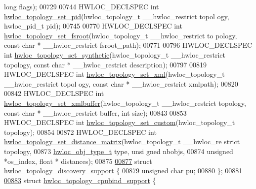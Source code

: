 \begin{DoxyCode}
      \textcolor{keywordtype}{long} flags);
00729 
00744 HWLOC\_DECLSPEC \textcolor{keywordtype}{int} \hyperlink{a00044_gae1100de0162b3c6a9db750ac14629c05}{hwloc_topology_set_pid}(hwloc\_topology\_t \_\_hwloc\_restrict topol
      ogy, hwloc\_pid\_t pid);
00745 
00770 HWLOC\_DECLSPEC \textcolor{keywordtype}{int} \hyperlink{a00044_ga2f6bfb6958d8b508ea1d7d5bb266432c}{hwloc_topology_set_fsroot}(hwloc\_topology\_t \_\_hwloc\_restrict to
      pology, \textcolor{keyword}{const} \textcolor{keywordtype}{char} * \_\_hwloc\_restrict fsroot\_path);
00771 
00796 HWLOC\_DECLSPEC \textcolor{keywordtype}{int} \hyperlink{a00044_ga2fcb52181b586c20f001b7a999550324}{hwloc_topology_set_synthetic}(hwloc\_topology\_t \_\_hwloc\_restrict
       topology, \textcolor{keyword}{const} \textcolor{keywordtype}{char} * \_\_hwloc\_restrict description);
00797 
00819 HWLOC\_DECLSPEC \textcolor{keywordtype}{int} \hyperlink{a00044_ga93efcc8a962afe1ed23393700682173f}{hwloc_topology_set_xml}(hwloc\_topology\_t \_\_hwloc\_restrict topol
      ogy, \textcolor{keyword}{const} \textcolor{keywordtype}{char} * \_\_hwloc\_restrict xmlpath);
00820 
00842 HWLOC\_DECLSPEC \textcolor{keywordtype}{int} \hyperlink{a00044_gae7e4bade144652a2b48f5eaf0309b4ec}{hwloc_topology_set_xmlbuffer}(hwloc\_topology\_t \_\_hwloc\_restrict
       topology, \textcolor{keyword}{const} \textcolor{keywordtype}{char} * \_\_hwloc\_restrict buffer, \textcolor{keywordtype}{int} size);
00843 
00853 HWLOC\_DECLSPEC \textcolor{keywordtype}{int} \hyperlink{a00044_ga12024fec46f9368fb8fc5c624089c5ec}{hwloc_topology_set_custom}(hwloc\_topology\_t topology);
00854 
00872 HWLOC\_DECLSPEC \textcolor{keywordtype}{int} \hyperlink{a00044_gabda6afa67a495cd652f064ad51d3fe47}{hwloc_topology_set_distance_matrix}(hwloc\_topology\_t \_\_hwloc\_re
      strict topology,
00873                                                       \hyperlink{a00041_gacd37bb612667dc437d66bfb175a8dc55}{hwloc_obj_type_t} type, \textcolor{keywordtype}{unsi
      gned} nbobjs,
00874                                                       \textcolor{keywordtype}{unsigned} *os\_index, \textcolor{keywordtype}{float} *
      distances);
00875 
\hypertarget{a00033_source_l00877}{}\hyperlink{a00024}{00877} \textcolor{keyword}{struct }\hyperlink{a00024}{hwloc_topology_discovery_support} \{
\hypertarget{a00033_source_l00879}{}\hyperlink{a00024_ad7bb4ecf7a82f5a04fc632e9592ad3ab}{00879}   \textcolor{keywordtype}{unsigned} \textcolor{keywordtype}{char} \hyperlink{a00024_ad7bb4ecf7a82f5a04fc632e9592ad3ab}{pu};
00880 \};
00881 
\hypertarget{a00033_source_l00883}{}\hyperlink{a00023}{00883} \textcolor{keyword}{struct }\hyperlink{a00023}{hwloc_topology_cpubind_support} \{

\end{DoxyCode}
